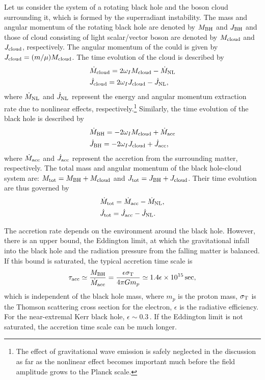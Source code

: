 \documentclass[%
 preprint,
 nofootinbib,
 amsmath,amssymb,
 aps,
 a4paper
]{revtex4-1}
\begin{document}
Let us consider the system of a rotating black hole and the boson cloud surrounding it, which is formed by the superradiant instability.
The mass and angular momentum of the rotating black hole are denoted by $M_{\rm BH}$ and $J_{\rm BH}$ and those of cloud consisting of light scalar/vector boson are denoted by $M_{\rm cloud}$ and $J_{\rm cloud}$, respectively. The angular momentum of the could is given by $J_{\rm cloud} = (m/\mu) M_{\rm cloud}$. 
The time evolution of the cloud is described by
\begin{align}
	&\dot M_{\rm cloud} = 2 \omega_I M_{\rm cloud}-\dot M_{\rm NL}\\
	&\dot J_{\rm cloud} = 2 \omega_I J_{\rm cloud}-\dot J_{\rm NL},
\end{align}
where $\dot M_{\rm NL}$ and $\dot J_{\rm NL}$ represent the energy and angular momentum extraction rate due to nonlinear effects, respectively.\footnote{
	The effect of gravitational wave emission is safely neglected in the discussion as far as the nonlinear effect becomes important much before the field amplitude grows to the Planck scale.
}
Similarly, the time evolution of the black hole is described by
\begin{align}
	&\dot M_{\rm BH} = -2 \omega_I M_{\rm cloud}+\dot M_{\rm acc}\\
	&\dot J_{\rm BH} = -2 \omega_I J_{\rm cloud}+\dot J_{\rm acc},
\end{align}
where $\dot M_{\rm acc}$ and $\dot J_{\rm acc}$ represent the accretion from the surrounding matter, respectively.
The total mass and angular momentum of the black hole-cloud system are: $M_{\rm tot} = M_{\rm BH} + M_{\rm cloud}$ and $J_{\rm tot} = J_{\rm BH} + J_{\rm cloud}$. Their time evolution are thus governed by
\begin{align}
	&\dot M_{\rm tot} = \dot M_{\rm acc} - \dot M_{\rm NL},\\
	&\dot J_{\rm tot} = \dot J_{\rm acc} - \dot J_{\rm NL}.
\end{align}

The accretion rate depends on the environment around the black hole.
However, there is an upper bound, the Eddington limit, at which the gravitational infall into the black hole and the radiation pressure from the falling matter is balanced. If this bound is saturated, the typical accretion time scale is 
\begin{align}
	\tau_{\rm acc} \simeq \frac{M_{\rm BH}}{\dot M_{\rm acc}} = \frac{\epsilon \sigma_{\rm T}}{4\pi G m_p} \simeq 1.4\epsilon \times 10^{15}\,{\rm sec},
	 \label{t_acc}
\end{align}
which is independent of the black hole mass, where $m_p$ is the proton mass, $\sigma_{\rm T}$ is the Thomson scattering cross section for the electron, $\epsilon$ is the radiative efficiency. For the near-extremal Kerr black hole, $\epsilon \sim 0.3$\,\cite{Thorne:1974ve}. %
If the Eddington limit is not saturated, the accretion time scale can be much longer. 
\end{document}
